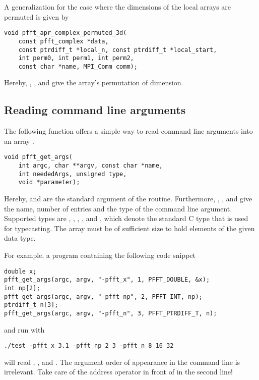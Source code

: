A generalization for the case where the dimensions of the local arrays are permuted is given by
\begin{lstlisting}
void pfft_apr_complex_permuted_3d(
    const pfft_complex *data,
    const ptrdiff_t *local_n, const ptrdiff_t *local_start,
    int perm0, int perm1, int perm2,
    const char *name, MPI_Comm comm);
\end{lstlisting}
Hereby, , , and  give the array's permutation of dimension.

\subsection{Reading command line arguments}
The following function offers a simple way to read command line arguments into an array .
\begin{lstlisting}
void pfft_get_args(
    int argc, char **argv, const char *name,
    int neededArgs, unsigned type,
    void *parameter);
\end{lstlisting}
Hereby,  and  are the standard argument of the  routine.
Furthermore, , , and  give the name, number of entries and the type of the command line argument.
Supported types are , , , , and ,
which denote the standard C type that is used for typecasting.
The array  must be of sufficient size to hold  elements of the given data type.

For example, a program  containing the following code snippet
\begin{lstlisting}
double x;
pfft_get_args(argc, argv, "-pfft_x", 1, PFFT_DOUBLE, &x);
int np[2];
pfft_get_args(argc, argv, "-pfft_np", 2, PFFT_INT, np);
ptrdiff_t n[3];
pfft_get_args(argc, argv, "-pfft_n", 3, PFFT_PTRDIFF_T, n);
\end{lstlisting}
and run with
\begin{lstlisting}
./test -pfft_x 3.1 -pfft_np 2 3 -pfft_n 8 16 32
\end{lstlisting}
will read , , and .
The argument order of appearance in the command line is irrelevant.
Take care of the address operator \code{&} in front of  in the second line!

